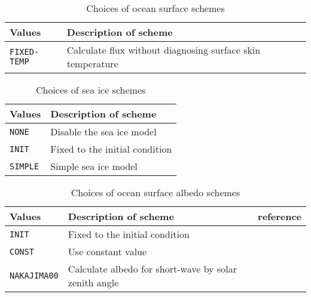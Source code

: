 \begin{table}[h]
\begin{center}
  \caption{Choices of ocean surface schemes}
  \label{tab:nml_ocean_sfc}
  \begin{tabularx}{150mm}{lX} \hline
    \rowcolor[gray]{0.9}  Values & Description of scheme \\ \hline
      \verb|FIXED-TEMP| & Calculate flux without diagnosing surface skin temperature \\
    \hline
  \end{tabularx}
\end{center}
\end{table}

\begin{table}[h]
\begin{center}
  \caption{Choices of sea ice schemes}
  \label{tab:nml_ocean_ice}
  \begin{tabularx}{150mm}{lX} \hline
    \rowcolor[gray]{0.9}  Values & Description of scheme \\ \hline
      \verb|NONE|   & Disable the sea ice model \\
      \verb|INIT|   & Fixed to the initial condition \\
      \verb|SIMPLE| & Simple sea ice model \\
    \hline
  \end{tabularx}
\end{center}
\end{table}

\begin{table}[h]
\begin{center}
  \caption{Choices of ocean surface albedo schemes}
  \label{tab:nml_ocean_alb}
  \begin{tabularx}{150mm}{llX} \hline
    \rowcolor[gray]{0.9}  Values & Description of scheme & reference \\ \hline
      \verb|INIT|       & Fixed to the initial condition \\
      \verb|CONST|      & Use constant value \\
      \verb|NAKAJIMA00| & Calculate albedo for short-wave by solar zenith angle & \citet{nakajima_2000} \\
    \hline
  \end{tabularx}
\end{center}
\end{table}

